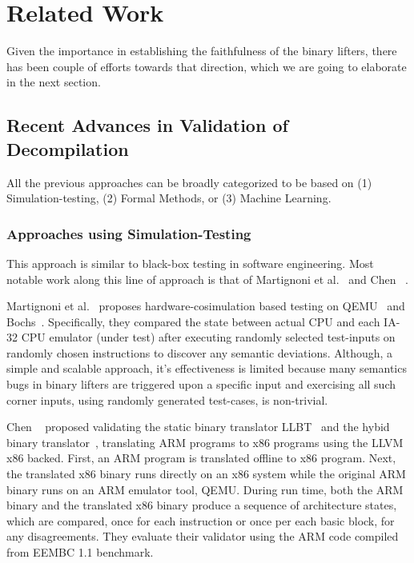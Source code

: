 \chapter{Related Work}\label{sec:related-work}

Given the importance in establishing the faithfulness of the binary lifters,
      there has been couple of efforts towards that direction, which we are
      going to elaborate in the next section.

\section{Recent Advances in Validation of Decompilation}\label{sec:recent-advances}
All the previous approaches can be broadly categorized to be based on (1)
  Simulation-testing, (2) Formal Methods, or (3) Machine Learning.  

\subsection{Approaches using Simulation-Testing}
This approach is similar to black-box testing in software engineering. Most
notable work along this line of approach is that of Martignoni et
al.~\cite{Martignoni:ISSTA2009, Martignoni:ISSTA2010,Martignoni:ASPLOS2012} and
Chen \etal~\cite{CLSS2015}.


Martignoni et al.~\cite{Martignoni:ISSTA2009, Martignoni:ISSTA2010} proposes
hardware-cosimulation based testing on QEMU~\cite{QEMU:USENIX05} and
Bochs~\cite{Bochs1996}.  Specifically, they compared the state between actual
CPU and each IA-32 CPU emulator (under test) after executing randomly selected
test-inputs on randomly chosen instructions  to discover any semantic
deviations.
Although, a simple and scalable approach, it's effectiveness is limited because
many semantics bugs in binary lifters are triggered upon a specific input and
exercising all such corner inputs, using randomly generated test-cases, is
non-trivial.

Chen \etal~\cite{CLSS2015} proposed validating the static binary translator
LLBT~\cite{LLBT2012} and the hybid binary translator~\cite{LLVMDBT2012},
  translating ARM programs to x86 programs using the LLVM x86 backed. First, an
  ARM program is translated offline to x86 program. Next, the translated x86
  binary runs directly on an x86 system while the original ARM binary runs on
  an ARM emulator tool, QEMU. During run time, both the ARM binary and the
  translated x86 binary produce a sequence of  architecture states, which are
  compared, once for each instruction or once per each basic block, for any
  disagreements. They evaluate their validator using the ARM code compiled from
  EEMBC 1.1 benchmark. 

